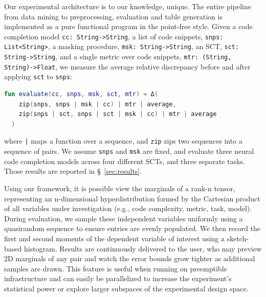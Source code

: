 \documentclass[usenames,dvipsnames]{article} %
\begin{document}

  Our experimental architecture is to our knowledge, unique. The entire pipeline from data mining to preprocessing, evaluation and table generation is implemented as a pure functional program in the point-free style. Given a code completion model \lstinline|cc: String->String|, a list of code snippets, \lstinline|snps: List<String>|, a masking procedure, \lstinline|msk: String->String|, an SCT, \lstinline|sct: String->String|, and a single metric over code snippets, \lstinline|mtr: (String, String)->Float|, we measure the average relative discrepancy before and after applying \lstinline|sct| to \lstinline|snps|:

  \noindent\begin{lstlisting}[basicstyle=\footnotesize\ttfamily, language=kotlin,label={lst:lstlisting}]
  fun evaluate(cc, snps, msk, sct, mtr) = Δ(
    zip(snps, snps | msk | cc) | mtr | average,
    zip(snps | sct, snps | sct | msk | cc) | mtr | average
  )
  \end{lstlisting}

  \noindent where \texttt{|} maps a function over a sequence, and \lstinline|zip| zips two sequences into a sequence of pairs. We assume \lstinline|snps| and \lstinline|msk| are fixed, and evaluate three neural code completion models across four different SCTs, and three separate tasks. Those results are reported in \S~\ref{sec:results}.

  Using our framework, it is possible view the marginals of a rank-n tensor, representing an n-dimensional hyperdistribution formed by the Cartesian product of all variables under investigation (e.g., code complexity, metric, task, model). During evaluation, we sample these independent variables uniformly using a quasirandom sequence to ensure entries are evenly populated. We then record the first and second moments of the dependent variable of interest using a sketch-based histogram. Results are continuously delivered to the user, who may preview 2D marginals of any pair and watch the error bounds grow tighter as additional samples are drawn. This feature is useful when running on preemptible infrastructure and can easily be parallelized to increase the experiment's statistical power or explore larger subspaces of the experimental design space.
\end{document}
